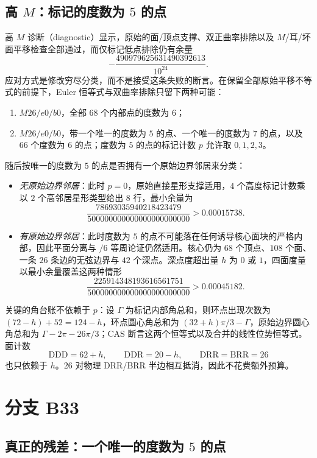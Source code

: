 \subsection{高 $M$：标记的度数为 $5$ 的点}

高 $M$ 诊断（diagnostic）显示，原始的面/顶点支撑、双正曲率排除以及 $M$/耳/坏面平移检查全部通过，而仅标记低点排除仍有余量
\[
-\frac{490979625631490392613}{10^{24}} .
\]
应对方式是修改穷尽分类，而不是接受这条失败的断言。在保留全部原始平移不等式的前提下，Euler 恒等式与双曲率排除只留下两种可能：
\begin{enumerate}[leftmargin=1.6em,itemsep=2pt]
\item $M26/e0/b0$，全部 $68$ 个内部点的度数为 $6$；
\item $M26/e0/b0$，带一个唯一的度数为 $5$ 的点、一个唯一的度数为 $7$ 的点，以及 $66$ 个度数为 $6$ 的点；度数为 $5$ 的点的标记计数 $p$ 允许取 $0,1,2,3$。
\end{enumerate}
随后按唯一的度数为 $5$ 的点是否拥有一个原始边界邻居来分类：
\begin{itemize}[leftmargin=1.4em,itemsep=3pt]
\item \emph{无原始边界邻居}：此时 $p=0$，原始直接星形支撑适用，$4$ 个高度标记计数乘以 $2$ 个高邻居星形类型给出 $8$ 行，最小余量为
\[
\frac{78693035940218423479}{500000000000000000000000}>0.00015738 .
\]
\item \emph{有原始边界邻居}：此时度数为 $5$ 的点不可能落在任何诱导核心面块的严格内部，因此平面分离与 $/6$ 等周论证仍然适用。核心仍为 $68$ 个顶点、$108$ 个面、一条 $26$ 条边的无弦边界与 $42$ 个深点。深点度超出量 $h$ 为 $0$ 或 $1$，四面度量以最小余量覆盖这两种情形
\[
\frac{225914348193616561751}{500000000000000000000000}>0.00045182 .
\]
\end{itemize}
关键的角台账不依赖于 $p$：设 $\Gamma$ 为标记内部角总和，则环点出现次数为 $(72-h)+52=124-h$，环点圆心角总和为 $(32+h)\pi/3-\Gamma$，原始边界圆心角总和为 $\Gamma-2\pi-26\pi/3$；CAS 断言这两个恒等式以及合并的线性位势恒等式。面计数
\[
\mathrm{DDD}=62+h,\qquad \mathrm{DDR}=20-h,\qquad \mathrm{DRR}=\mathrm{BRR}=26
\]
也只依赖于 $h$。$26$ 对物理 DRR/BRR 半边相互抵消，因此不花费额外预算。

\section{分支 B33}

\subsection{真正的残差：一个唯一的度数为 $5$ 的点}

